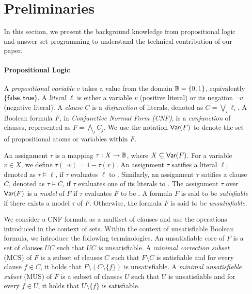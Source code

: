 \section{Preliminaries}
\label{section:preliminaries}
In this section, we present the background knowledge from propositional logic and answer set programming to understand the technical contribution of our paper. 

\paragraph{Propositional Logic} A \emph{propositional variable} $v$ takes a value from the domain $\mathbb{B} = \{0,1\}$, equivalently $\{\mathsf{false}, \mathsf{true}\}$. 
A \emph{literal} $\ell$ is either a variable $v$ (positive literal) or its negation $\neg{v}$ (negative literal).
A \emph{clause} $C$ is a {\em disjunction} of literals, denoted as $C = \bigvee_{i} \ell_i$. 
A Boolean formula $F$, in \emph{Conjunctive Normal Form (CNF)}, is a {\em conjunction}
of clauses, represented as $F = \bigwedge_{j} C_j$. We use the notation $\mathsf{Var}(F)$ to denote the set of propositional atoms or variables within  
$F$. 

An assignment $\tau$ is a mapping $\tau: X \rightarrow \mathbb{B}$, where $X \subseteq \mathsf{Var}(F)$.  For a variable $v \in X$, we define
$\tau(\neg{v}) = 1 - \tau(v)$. 
An assignment $\tau$ satifies a literal $\ell$, denoted as $\tau \models \ell$, if $\tau$ evaluates $\ell$ to \true.
Similarly, an assignment $\tau$ satifies a clause $C$, denoted as $\tau \models C$, if $\tau$ evaluates one of its literals to \true.
The assignment $\tau$ over $\mathsf{Var}(F)$ is a {\em model} of $F$ if $\tau$ evaluates $F$ to be \true. 
A formula $F$ is said to be {\em satisfiable} if there exists a model $\tau$ of $F$.
Otherwise, the formula $F$ is said to be {\em unsatisfiable}.

We consider a CNF formula as a multiset of clauses and use the operations introduced in the context of sets.
Within the context of unsatisfiable Boolean formula, we introduce the following terminologies. 
An unsatisfiable core of $F$ is a set of clauses $UC$ such that $UC$ is unsatisfiable. 
A {\em minimal correction subset} (MCS) of $F$ is a subset of clauses $C$ such that $F \setminus C$ is satisfiable and for every clause $f \in C$, it holds that $F \setminus (C \setminus \{f\})$ is unsatisfiable.
A {\em minimal unsatisfiable subset} (MUS) of $F$ is a subset of clauses $U$ such that $U$ is unsatisfiable and for every $f \in U$, it holds that $U \setminus \{f\}$ is satisfiable.


